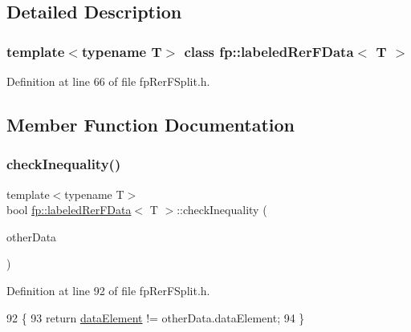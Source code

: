 \subsection{Detailed Description}
\subsubsection*{template$<$typename T$>$\newline
class fp\+::labeled\+Rer\+F\+Data$<$ T $>$}



Definition at line 66 of file fp\+Rer\+F\+Split.\+h.



\subsection{Member Function Documentation}
\mbox{\label{classfp_1_1labeledRerFData_a4f7bdd5ff9931f899ed534e3d15a6a1a}} 
\subsubsection{\texorpdfstring{check\+Inequality()}{checkInequality()}}
{\footnotesize\ttfamily template$<$typename T$>$ \\
bool \hyperlink{classfp_1_1labeledRerFData}{fp\+::labeled\+Rer\+F\+Data}$<$ T $>$\+::check\+Inequality (\begin{DoxyParamCaption}\item[{const \hyperlink{classfp_1_1labeledRerFData}{labeled\+Rer\+F\+Data}$<$ T $>$ \&}]{other\+Data }\end{DoxyParamCaption})\hspace{0.3cm}{\ttfamily [inline]}}



Definition at line 92 of file fp\+Rer\+F\+Split.\+h.


\begin{DoxyCode}
92                                                                                 \{
93                     \textcolor{keywordflow}{return} \hyperlink{classfp_1_1labeledRerFData_ace341f012e4e282c5a926ccb62246e84}{dataElement} != otherData.dataElement;
94                 \}
\end{DoxyCode}
\mbox{\label{classfp_1_1labeledRerFData_a8e5d0268a82f465278f58e5f1d9c79b5}} 
